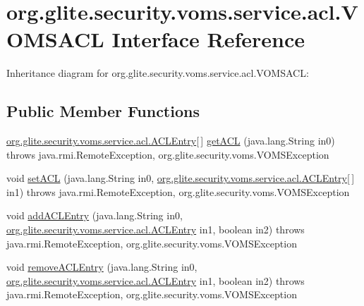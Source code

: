 \hypertarget{interfaceorg_1_1glite_1_1security_1_1voms_1_1service_1_1acl_1_1VOMSACL}{
\section{org.glite.security.voms.service.acl.VOMSACL Interface Reference}
\label{interfaceorg_1_1glite_1_1security_1_1voms_1_1service_1_1acl_1_1VOMSACL}
}


Inheritance diagram for org.glite.security.voms.service.acl.VOMSACL:
\subsection*{Public Member Functions}
\begin{DoxyCompactItemize}
\item 
\hyperlink{classorg_1_1glite_1_1security_1_1voms_1_1service_1_1acl_1_1ACLEntry}{org.glite.security.voms.service.acl.ACLEntry}\mbox{[}$\,$\mbox{]} \hyperlink{interfaceorg_1_1glite_1_1security_1_1voms_1_1service_1_1acl_1_1VOMSACL_adfcbcf4b14c6f44b3b635566cd333486}{getACL} (java.lang.String in0)  throws java.rmi.RemoteException, org.glite.security.voms.VOMSException
\item 
void \hyperlink{interfaceorg_1_1glite_1_1security_1_1voms_1_1service_1_1acl_1_1VOMSACL_ace9e44d3027b283c04747dd14e330425}{setACL} (java.lang.String in0, \hyperlink{classorg_1_1glite_1_1security_1_1voms_1_1service_1_1acl_1_1ACLEntry}{org.glite.security.voms.service.acl.ACLEntry}\mbox{[}$\,$\mbox{]} in1)  throws java.rmi.RemoteException, org.glite.security.voms.VOMSException
\item 
void \hyperlink{interfaceorg_1_1glite_1_1security_1_1voms_1_1service_1_1acl_1_1VOMSACL_ae10e282f17cff1ccb153a6053ffd3cb1}{addACLEntry} (java.lang.String in0, \hyperlink{classorg_1_1glite_1_1security_1_1voms_1_1service_1_1acl_1_1ACLEntry}{org.glite.security.voms.service.acl.ACLEntry} in1, boolean in2)  throws java.rmi.RemoteException, org.glite.security.voms.VOMSException
\item 
void \hyperlink{interfaceorg_1_1glite_1_1security_1_1voms_1_1service_1_1acl_1_1VOMSACL_a40be29686bada498297fa0bb6953f34a}{removeACLEntry} (java.lang.String in0, \hyperlink{classorg_1_1glite_1_1security_1_1voms_1_1service_1_1acl_1_1ACLEntry}{org.glite.security.voms.service.acl.ACLEntry} in1, boolean in2)  throws java.rmi.RemoteException, org.glite.security.voms.VOMSException
\item 

\end{DoxyCompactItemize}
